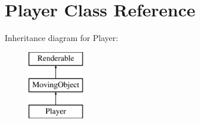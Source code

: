 \hypertarget{class_player}{}\section{Player Class Reference}
\label{class_player}
Inheritance diagram for Player\+:\begin{figure}[H]
\begin{center}
\leavevmode
\includegraphics[height=3.000000cm]{class_player}
\end{center}
\end{figure}
